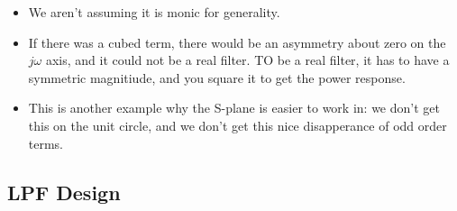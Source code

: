 \begin{itemize}
\item{We aren't assuming it is monic for generality. }

\item{If there was a cubed term, there would be an asymmetry about zero on the
$j\omega$ axis, and it could not be a real filter. TO be a real filter,
it has to have a symmetric magnitiude, and you square it to get the power
response.} 

\item{This is another example why the S-plane is easier to work in: we don't
get this on the unit circle, and we don't get this nice disapperance of
odd order terms. }

\end{itemize}

\subsection*{LPF Design}

